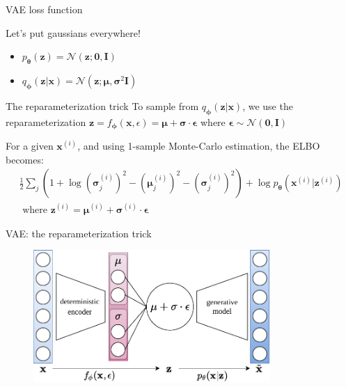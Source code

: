 \documentclass[handout]{beamer}
\begin{document}
  \begin{frame}{VAE loss function}

  
    Let's put gaussians everywhere!
    \begin{itemize}
      \item $p_{\boldsymbol{\theta}}(\mathbf{z}) = \mathcal{N}(\mathbf{z}; \mathbf{0}, \mathbf{I})$
      \item $q_{\boldsymbol{\phi}}(\mathbf{z}|\mathbf{x}) = \mathcal{N}(\mathbf{z}; \boldsymbol{\mu}, \boldsymbol{\sigma}^2\mathbf{I})$
    \end{itemize}
    \pause
    \begin{block}{The reparameterization trick}
      To sample from $q_{\boldsymbol{\phi}}(\mathbf{z}|\mathbf{x})$, we use the reparameterization $\mathbf{z} = f_{\boldsymbol{\phi}}(\mathbf{x}, \epsilon) = \boldsymbol{\mu} + \boldsymbol{\sigma} \cdot \boldsymbol{\epsilon}$ where $\boldsymbol{\epsilon} \sim \mathcal{N}(\mathbf{0}, \mathbf{I})$
    \end{block}
    \pause
    \small{For a given $\mathbf{x}^{(i)}$, and using 1-sample Monte-Carlo estimation, the ELBO becomes:}
    \vspace{0cm}
    \begin{multline*}
      \frac{1}{2} \sum_j \left(1 + \log (\boldsymbol{\sigma}^{(i)}_j)^2 - (\boldsymbol{\mu}^{(i)}_j)^2 - (\boldsymbol{\sigma}^{(i)}_j)^2 \right) + \log p_{\boldsymbol{\theta}}(\mathbf{x}^{(i)}|\mathbf{z}^{(i)})\\
      \text{ where } \mathbf{z}^{(i)} = \boldsymbol{\mu}^{(i)} + \boldsymbol{\sigma}^{(i)} \cdot \boldsymbol{\epsilon}
    \end{multline*}

  \end{frame}

  \begin{frame}{VAE: the reparameterization trick}

    \begin{figure}
      \includegraphics[width=9cm]{rc/vae-reparameterization}
    \end{figure}
    
  \end{frame}
\end{document}
